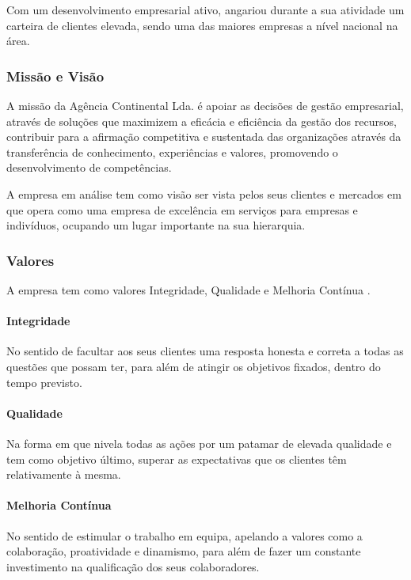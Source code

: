 Com um desenvolvimento empresarial ativo, angariou durante a sua atividade um carteira de clientes elevada, sendo uma das maiores empresas a nível nacional na área.

\subsubsection{Missão e Visão}

A missão da Agência Continental Lda. é apoiar as decisões de gestão empresarial, através de soluções que maximizem a eficácia e eficiência da gestão dos recursos, contribuir para a afirmação competitiva e sustentada das organizações através da transferência de conhecimento, experiências e valores, promovendo o desenvolvimento de competências.

A empresa em análise tem como visão ser vista pelos seus clientes e mercados em que opera como uma empresa de excelência em serviços para empresas e indivíduos, ocupando um lugar importante na sua hierarquia\parencite{agenciacontinental}.

\subsubsection{Valores}

A empresa tem como valores Integridade, Qualidade e Melhoria Contínua \parencite{agenciacontinental}.

\paragraph{Integridade} No sentido de facultar aos seus clientes uma resposta honesta e correta a todas as questões que possam ter, para além de atingir os objetivos fixados, dentro do tempo previsto.

\paragraph{Qualidade} Na forma em que nivela todas as ações por um patamar de elevada qualidade e tem como objetivo último, superar as expectativas que os clientes têm relativamente à mesma.

\paragraph{Melhoria Contínua} No sentido de estimular o trabalho em equipa, apelando a valores como a colaboração, proatividade e dinamismo, para além de fazer um constante investimento na qualificação dos seus colaboradores.

